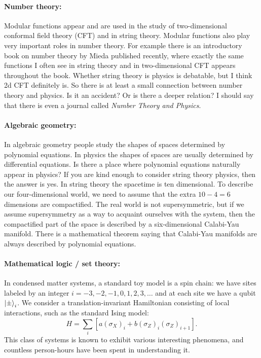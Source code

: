 \documentclass[12pt]{article}
\numberwithin{equation}{section}
\numberwithin{figure}{section}
\theoremstyle{remark}
\begin{document}
\paragraph{Number theory:}
Modular functions appear and are used in the study of two-dimensional conformal field theory (CFT) and in string theory.
Modular functions also play very important roles in number theory.
For example there is an introductory book on number theory by Mieda \cite{Mieda} published recently,
where exactly the same functions I often see in string theory and in two-dimensional CFT appears throughout the book.
Whether string theory is physics is debatable, but I think 2d CFT definitely is.
So there is at least a small connection between number theory and physics.
Is it an accident? Or is there a deeper relation?
I should say that there is even a journal called \emph{Number Theory and Physics}.

\paragraph{Algebraic geometry:}
In algebraic geometry people study the shapes of spaces determined by polynomial equations. 
In physics the shapes of spaces are usually determined by differential equations.
Is there a place where polynomial equations naturally appear in physics?
If you are kind enough to consider string theory physics, then the answer is yes.
In string theory the spacetime is ten dimensional.
To describe our four-dimensional world, we need to assume that the extra $10-4=6$ dimensions are compactified.
The real world is not supersymmetric, but if we assume supersymmetry as a way to acquaint ourselves with the system,
then the compactified part of the space is described by a six-dimensional Calabi-Yau manifold.
There is a mathematical theorem saying that Calabi-Yau manifolds are always described by polynomial equations.

\paragraph{Mathematical logic / set theory:}
In condensed matter systems, a standard toy model is a spin chain:
we have sites labeled by an integer $i=-3, -2, -1, 0, 1, 2, 3, \ldots$
and at each site we have a qubit $\ket{\pm}_i$. 
We consider a translation-invariant Hamiltonian consisting of local interactions,
such as the  standard Ising model: \begin{equation}
H = \sum_i [ a (\sigma_X)_i + b (\sigma_Z)_i (\sigma_Z)_{i+1} ].
\end{equation}
This class of systems is known to exhibit various interesting phenomena,
and countless person-hours have been spent in understanding it. 
\end{document}
